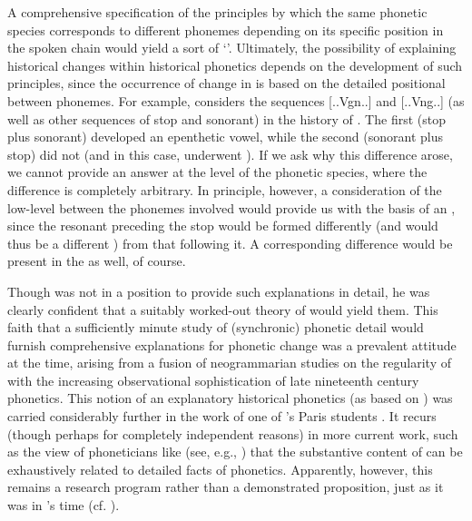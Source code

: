 A comprehensive specification of the principles by which the same
phonetic species corresponds to different phonemes depending on its
specific position in the spoken chain would yield a sort of
`'. Ultimately, the possibility of explaining
historical changes within historical phonetics depends on the
development of such principles, since the occurrence of change in
\emph{} is based on the detailed positional  between
phonemes. For example, {\Saussure} considers the sequences [..Vgn..] and
[..Vng..] (as well as other sequences of stop and sonorant) in the
history of . The first (stop plus sonorant) developed an
epenthetic vowel, while the second (sonorant plus stop) did not (and
in this case, underwent ). If we ask why this difference
arose, we cannot provide an answer at the level of the phonetic
species, where the difference is completely arbitrary. In principle,
however, a consideration of the low-level  between the
phonemes involved would provide us with the basis of an ,
since the resonant preceding the stop would be formed differently (and
would thus be a different ) from that following it. A
corresponding difference would be present in the  as well, of
course.

Though {\Saussure} was not in a position to provide such explanations in
detail, he was clearly confident that a suitably worked-out theory of
 would yield them. This faith that a
sufficiently minute study of (synchronic) phonetic detail would
furnish comprehensive explanations for phonetic change was a prevalent
attitude at the time, arising from a fusion of neogrammarian studies
on the regularity of  with the increasing observational
sophistication of late nineteenth century phonetics. This notion of an
explanatory historical phonetics (as based on )
was carried considerably further in the work of one of {\Saussure}'s
Paris students \citep{grammont33:traite}.  It recurs (though perhaps
for completely independent reasons) in more current work, such as the
view of phoneticians like  (see, e.g.,
\citealt{ohala79:saussure}) that the substantive content of
 can be exhaustively related to detailed facts of
phonetics. Apparently, however, this remains a research program rather
than a demonstrated proposition, just as it was in {\Saussure}'s time
(cf. \citealt{sra81:unnatural}).

